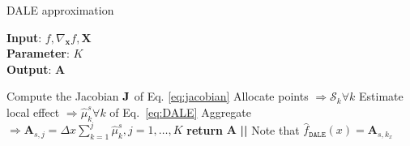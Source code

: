 \documentclass[wcp]{jmlr}
\newcommand{\dale}{\hat{f}_{\mathtt{DALE}}}
\begin{document}
\begin{algorithm}[h]
\caption{DALE approximation}
\label{alg:dale} \textbf{Input}: \( f, \nabla_{\mathbf{x}} f, \mathbf{X} \) \\ \textbf{Parameter}: \( K \) \\ \textbf{Output}: \(\mathbf{A}\)
\begin{algorithmic}[1]
  \STATE Compute the Jacobian \(\mathbf{J}\) of Eq. \eqref{eq:jacobian}
  \STATE Allocate points \( \Rightarrow \mathcal{S}_k \forall k \)
  \STATE Estimate local effect \( \Rightarrow \hat{\mu}_k^s \forall k\) of Eq.~\eqref{eq:DALE}
  \STATE Aggregate \( \Rightarrow \mathbf{A}_{s,j} = \Delta x\sum_{k=1}^{j} \hat{\mu}_k^s, j = 1, \ldots, K \)
  \ENDFOR
  \STATE \textbf{return} \(\mathbf{A}\) \textbf{||} Note that \( \dale(x) = \mathbf{A}_{s,k_x} \)
\end{algorithmic}
\end{algorithm}
\end{document}
